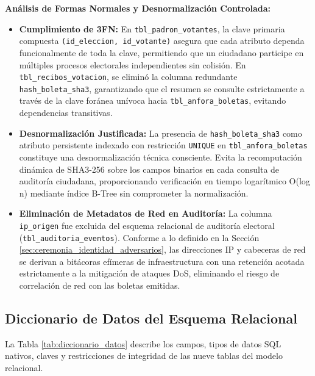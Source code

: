 \noindent\textbf{Análisis de Formas Normales y Desnormalización Controlada:}
\begin{itemize}
	\item \textbf{Cumplimiento de 3FN:} En \texttt{tbl\_padron\_votantes}, la clave primaria compuesta \texttt{(id\_eleccion, id\_votante)} asegura que cada atributo dependa funcionalmente de toda la clave, permitiendo que un ciudadano participe en múltiples procesos electorales independientes sin colisión. En \texttt{tbl\_recibos\_votacion}, se eliminó la columna redundante \texttt{hash\_boleta\_sha3}, garantizando que el resumen se consulte estrictamente a través de la clave foránea unívoca hacia \texttt{tbl\_anfora\_boletas}, evitando dependencias transitivas.
	\item \textbf{Desnormalización Justificada:} La presencia de \texttt{hash\_boleta\_sha3} como atributo persistente indexado con restricción \texttt{UNIQUE} en \texttt{tbl\_anfora\_boletas} constituye una desnormalización técnica consciente. Evita la recomputación dinámica de SHA3-256 sobre los campos binarios en cada consulta de auditoría ciudadana, proporcionando verificación en tiempo logarítmico O(log n) mediante índice B-Tree sin comprometer la normalización.
	\item \textbf{Eliminación de Metadatos de Red en Auditoría:} La columna \texttt{ip\_origen} fue excluida del esquema relacional de auditoría electoral (\texttt{tbl\_auditoria\_eventos}). Conforme a lo definido en la Sección \ref{sec:ceremonia_identidad_adversarios}, las direcciones IP y cabeceras de red se derivan a bitácoras efímeras de infraestructura con una retención acotada estrictamente a la mitigación de ataques DoS, eliminando el riesgo de correlación de red con las boletas emitidas.
\end{itemize}

\subsection{Diccionario de Datos del Esquema Relacional}

La Tabla \ref{tab:diccionario_datos} describe los campos, tipos de datos SQL nativos, claves y restricciones de integridad de las nueve tablas del modelo relacional.

